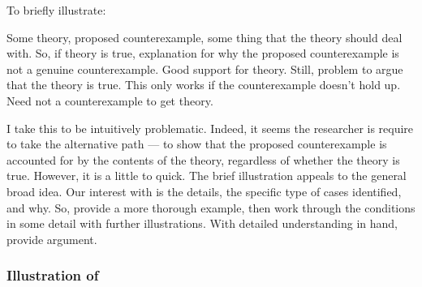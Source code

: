 \begin{note}
  To briefly illustrate:

  Some theory, proposed counterexample, some thing that the theory should deal with.
  So, if theory is true, explanation for why the proposed counterexample is not a genuine counterexample.
  Good support for theory.
  Still, problem to argue that the theory is true.
  This only works if the counterexample doesn't hold up.
  Need not a counterexample to get theory.

  I take this to be intuitively problematic.
  Indeed, it seems the researcher is require to take the alternative path --- to show that the proposed counterexample is accounted for by the contents of the theory, regardless of whether the theory is true.
  However, it is a little to quick.
  The brief illustration appeals to the general broad idea.
  Our interest with \nI{} is the details, the specific type of cases identified, and why.
  So, provide a more thorough example, then work through the conditions in some detail with further illustrations.
  With detailed understanding in hand, provide argument.
\end{note}

\subsubsection{Illustration of \nI{}}
\label{sec:illustration-ni}

